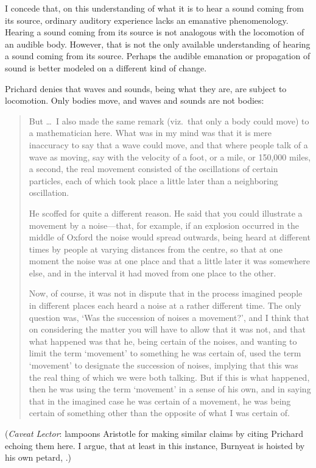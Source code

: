 I concede that, on this understanding of what it is to hear a sound coming from its source, ordinary auditory experience lacks an emanative phenomenology. Hearing a sound coming from its source is not analogous with the locomotion of an audible body. However, that is not the only available understanding of hearing a sound coming from its source. Perhaps the audible emanation or propagation of sound is better modeled on a different kind of change. 

Prichard denies that waves and sounds, being what they are, are subject to locomotion. Only bodies move, and waves and sounds are not bodies:
\begin{quotation}
	But \dots\ I also made the same remark (viz.\ that only a body could move) to a mathematician here. What was in my mind was that it is mere inaccuracy to say that a wave could move, and that where people talk of a wave as moving, say with the velocity of a foot, or a mile, or 150,000 miles, a second, the real movement consisted of the oscillations of certain particles, each of which took place a little later than a neighboring oscillation.
	
	He scoffed for quite a different reason. He said that you could illustrate a movement by a noise---that, for example, if an explosion occurred in the middle of Oxford the noise would spread outwards, being heard at different times by people at varying distances from the centre, so that at one moment the noise was at one place and that a little later it was somewhere else, and in the interval it had moved from one place to the other.
	
	Now, of course, it was not in dispute that in the process imagined people in different places each heard a noise at a rather different time. The only question was, `Was the succession of noises a movement?', and I think that on considering the matter you will have to allow that it was not, and that what happened was that he, being certain of the noises, and wanting to limit the term `movement' to something he was certain of, used the term `movement' to designate the succession of noises, implying that this was the real thing of which we were both talking. But if this is what happened, then he was using the term `movement' in a sense of his own, and in saying that in the imagined case he was certain of a movement, he was being certain of something other than the opposite of what I was certain of. \citep[99]{Prichard:1950kx}
\end{quotation}
(\emph{Caveat Lector}: \citealt[430 n. 29, appendix,]{Burnyeat:1995fk} lampoons Aristotle for making similar claims by citing Prichard echoing them here. I argue, that at least in this instance, Burnyeat is hoisted by his own petard, \citealt[chapter 3.2]{Kalderon:2015fr}.)

